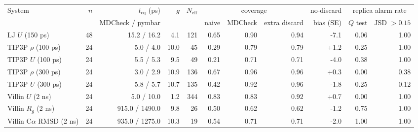 \begin{tabular}{lrrrrrrrrrr}
\toprule
System & $n$ & $t_{\mathrm{eq}}$ (ps) & $g$ & $N_{\mathrm{eff}}$ & \multicolumn{3}{c}{coverage} & no-discard & \multicolumn{2}{c}{replica alarm rate} \\
\cmidrule(lr){6-8}\cmidrule(lr){10-11}
 & & MDCheck / pymbar & & & naive & MDCheck & extra discard & bias (SE) & $Q$ test & JSD $>0.15$ \\
\midrule
LJ $U$ (150 ps) & 48 & 15.2 / 16.2 & 4.1 & 121 & 0.65 & 0.90 & 0.94 & -7.1 & 0.06 & 1.00 \\
TIP3P $\rho$ (100 ps) & 24 & 5.0 / 4.0 & 10.0 & 45 & 0.29 & 0.79 & 0.79 & +1.2 & 0.25 & 1.00 \\
TIP3P $U$ (100 ps) & 24 & 5.5 / 5.3 & 9.5 & 49 & 0.21 & 0.71 & 0.71 & -4.0 & 0.38 & 1.00 \\
TIP3P $\rho$ (300 ps) & 24 & 3.0 / 2.9 & 10.9 & 136 & 0.67 & 0.96 & 0.96 & +0.3 & 0.00 & 0.38 \\
TIP3P $U$ (300 ps) & 24 & 5.8 / 5.7 & 10.7 & 135 & 0.42 & 0.92 & 0.96 & -1.8 & 0.25 & 0.12 \\
Villin $U$ (2 ns) & 24 & 5.0 / 10.0 & 1.2 & 344 & 0.83 & 0.83 & 0.92 & +0.7 & 0.00 & 1.00 \\
Villin $R_g$ (2 ns) & 24 & 915.0 / 1490.0 & 9.8 & 26 & 0.50 & 0.62 & 0.62 & -1.2 & 0.75 & 1.00 \\
Villin C$\alpha$ RMSD (2 ns) & 24 & 935.0 / 1275.0 & 10.3 & 19 & 0.54 & 0.71 & 0.71 & -2.0 & 1.00 & 1.00 \\
\bottomrule
\end{tabular}
